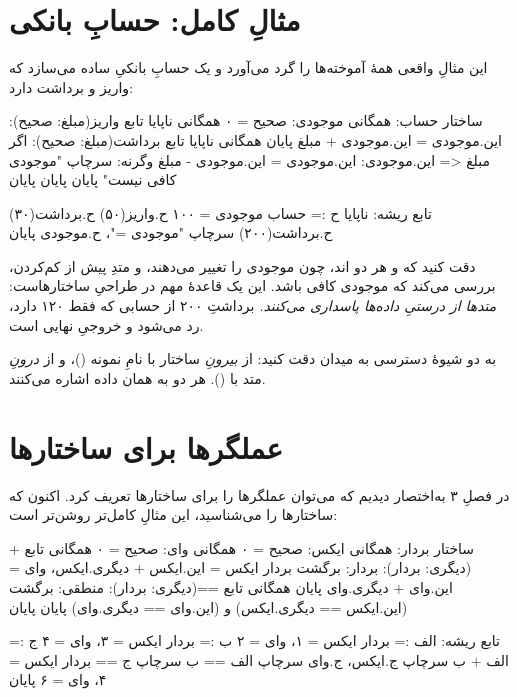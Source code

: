 \section{مثالِ کامل: حسابِ بانکی}

این مثالِ واقعی همهٔ آموخته‌ها را گرد می‌آورد و یک حسابِ بانکیِ ساده می‌سازد که
واریز و برداشت دارد:

\begin{salamfa}
ساختار حساب:
    همگانی موجودی: صحیح = ۰
    همگانی ناپایا تابع واریز(مبلغ: صحیح): این.موجودی = این.موجودی + مبلغ پایان
    همگانی ناپایا تابع برداشت(مبلغ: صحیح):
        اگر مبلغ <= این.موجودی: این.موجودی = این.موجودی - مبلغ
        وگرنه:                   سرچاپ "موجودی کافی نیست"
        پایان
    پایان
پایان

تابع ریشه:
    ناپایا ح := حساب { موجودی = ۱۰۰ }
    ح.واریز(۵۰)
    ح.برداشت(۳۰)
    ح.برداشت(۲۰۰)
    سرچاپ "موجودی ="، ح.موجودی
پایان
\end{salamfa}

دقت کنید که  و  هر دو اند، چون
موجودی را تغییر می‌دهند، و متدِ  پیش از کم‌کردن، بررسی می‌کند که موجودی کافی
باشد. این یک قاعدهٔ مهم در طراحیِ ساختارهاست: \emph{متدها از درستیِ داده‌ها
پاسداری می‌کنند.} برداشتِ ۲۰۰ از حسابی که فقط ۱۲۰ دارد، رد می‌شود و خروجیِ
نهایی  است.

\begin{tip}
به دو شیوهٔ دسترسی به میدان دقت کنید: از \emph{بیرونِ} ساختار با نامِ نمونه
()، و از \emph{درونِ} متد با  ().
هر دو به همان داده اشاره می‌کنند.
\end{tip}

\section{عملگرها برای ساختارها}

در فصلِ ۳ به‌اختصار دیدیم که می‌توان عملگرها را برای ساختارها تعریف کرد. اکنون
که ساختارها را می‌شناسید، این مثالِ کامل‌تر روشن‌تر است:

\begin{salamfa}
ساختار بردار:
    همگانی ایکس: صحیح = ۰
    همگانی وای: صحیح = ۰
    همگانی تابع +(دیگری: بردار): بردار:
        برگشت بردار { ایکس = این.ایکس + دیگری.ایکس، وای = این.وای + دیگری.وای }
    پایان
    همگانی تابع ==(دیگری: بردار): منطقی:
        برگشت (این.ایکس == دیگری.ایکس) و (این.وای == دیگری.وای)
    پایان
پایان

تابع ریشه:
    الف := بردار { ایکس = ۱، وای = ۲ }
    ب := بردار { ایکس = ۳، وای = ۴ }
    ج := الف + ب
    سرچاپ ج.ایکس، ج.وای
    سرچاپ الف == ب
    سرچاپ ج == بردار { ایکس = ۴، وای = ۶ }
پایان
\end{salamfa}

